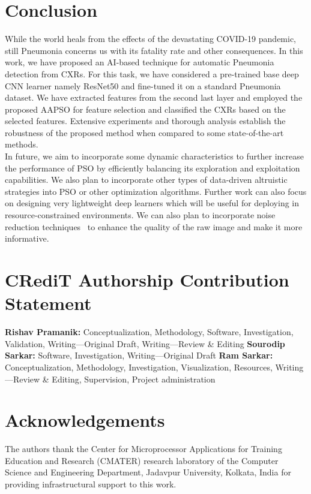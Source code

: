 \documentclass[final,3p,times]{elsarticle}
\begin{document}
\section{Conclusion}
\label{sec:conclusion}
While the world heals from the effects of the devastating COVID-19 pandemic, still Pneumonia concerns us with its fatality rate and other consequences. In this work, we have proposed an AI-based technique for automatic Pneumonia detection from CXRs. For this task, we have considered a pre-trained base deep CNN learner namely ResNet50 and fine-tuned it on a standard Pneumonia dataset. We have extracted features from the second last layer and {employed} the proposed AAPSO for feature selection and classified {the CXRs} based on the selected features. Extensive experiments and thorough analysis establish the robustness of the proposed method when compared to some state-of-the-art methods.\\
In future, we aim to incorporate some dynamic characteristics to further increase the performance of PSO by efficiently balancing its exploration and exploitation capabilities. We also plan to incorporate other types of data-driven altruistic strategies into PSO or other optimization algorithms. Further work can also focus on designing very lightweight deep learners which will be {useful for deploying} in resource-constrained environments. {We can also plan to incorporate noise reduction techniques~\cite{bi2019temporal} to enhance the quality of the raw image and make it more informative.}
\section*{CRediT Authorship Contribution Statement}
\textbf{Rishav Pramanik:} Conceptualization, Methodology, Software, Investigation, Validation, Writing—Original Draft, Writing—Review \& Editing
\textbf{Sourodip Sarkar:} Software, Investigation, Writing—Original Draft 
\textbf{Ram Sarkar:} Conceptualization, Methodology, Investigation, Visualization, Resources, Writing—Review \& Editing, Supervision, Project administration
\section*{Acknowledgements}
The authors thank the Center for Microprocessor Applications for Training Education and Research (CMATER) research laboratory of the Computer Science and Engineering Department, Jadavpur University, Kolkata, India for providing infrastructural support to this work.
 

\end{document}
